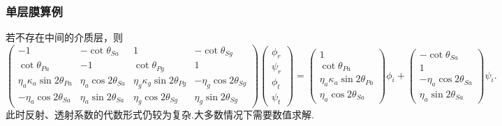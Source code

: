 \subsubsection{单层膜算例}
若不存在中间的介质层，则
\begin{equation*}
	\left( \begin{array}{cccc}
		-1                               & -\cot\theta_{Sa}        & 1                                & -\cot\theta_{Sg}         \\
		\cot\theta_{Pa}                  & -1                      & \cot\theta_{Pg}                  & 1                        \\
		\eta_a \kappa_a \sin2\theta_{Pa} & \eta_a \cos2\theta_{Sa} & \eta_g \kappa_g \sin2\theta_{Pg} & -\eta_g \cos2\theta_{Sg} \\
		-\eta_a \cos2\theta_{Sa}         & \eta_a \sin2\theta_{Sa} & \eta_g \cos2\theta_{Sg}          & \eta_g \sin2\theta_{Sg}
	\end{array} \right) \begin{pmatrix} \phi_r \\ \psi_r \\ \phi_t \\ \psi_t \end{pmatrix} =
	\begin{pmatrix} 1 \\ \cot\theta_{Pa} \\ \eta_a \kappa_a \sin2\theta_{Pa} \\ \eta_a \cos2\theta_{Sa} \end{pmatrix} \phi_i +
	\begin{pmatrix} -\cot\theta_{Sa} \\ 1 \\ -\eta_a \cos2\theta_{Sa} \\ \eta_a \sin2\theta_{Sa} \end{pmatrix} \psi_i.
\end{equation*}
此时反射、透射系数的代数形式仍较为复杂.大多数情况下需要数值求解.

